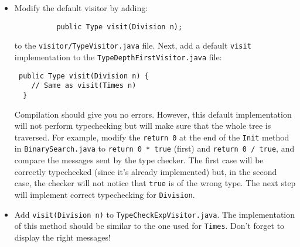 \documentclass{article}
\begin{document}
\begin{itemize}
\item Modify the default visitor by adding:
\begin{verbatim}
          public Type visit(Division n);
\end{verbatim}
to the \verb+visitor/TypeVisitor.java+ file. Next, add a default \verb+visit+ implementation to the \verb+TypeDepthFirstVisitor.java+ file:
\begin{verbatim}
 public Type visit(Division n) {
    // Same as visit(Times n)
  }
\end{verbatim}
 Compilation should give you no errors. However, this default implementation will not perform typechecking but will make sure that the whole tree is traversed. For example, modify the \verb+return 0+ at the end of the \verb+Init+ method in \verb+BinarySearch.java+ to \verb+return 0 * true+ (first) and \verb+return 0 / true+, and compare the messages sent by the type checker. The first case will be correctly typechecked (since it's already implemented) but, in the second case, the checker will not notice that \verb+true+ is of the wrong type. The next step will implement correct  typechecking for \verb+Division+.

\item Add \verb+visit(Division n)+ to \verb+TypeCheckExpVisitor.java+. The implementation of this method should be similar to the one used for \verb+Times+. Don't forget to display the right messages!


\end{itemize}
\end{document}
